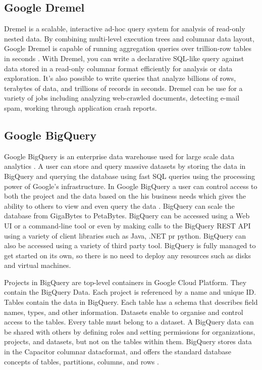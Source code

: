 \subsection{Google Dremel}
 
     Dremel is a scalable, interactive ad-hoc query system for
     analysis of read-only nested data. By combining multi-level
     execution trees and columnar data layout, Google Dremel is
     capable of running aggregation queries over trillion-row tables
     in seconds \cite{paper-dremel}. With Dremel, you can write a
     declarative SQL-like query against data stored in a read-only
     columnar format efficiently for analysis or data exploration.
     It's also possible to write queries that analyze billions of
     rows, terabytes of data, and trillions of records in
     seconds. Dremel can be use for a variety of jobs including
     analyzing web-crawled documents, detecting e-mail spam, working
     through application crash reports.

\subsection{Google BigQuery}


     Google BigQuery is an enterprise data
     warehouse used for large scale data
     analytics \cite{www-bigquery-documentation} \cite{www-bigquery}.
     A user can store
     and query massive datasets by storing the data in BigQuery and
     querying the database using fast SQL queries using the processing
     power of Google's infrastructure. In Google BigQuery a user can
     control access to both the project and the data based on the his
     business needs which gives the ability to others to view and even
     query the data \cite{www-bigquery}. BigQuery can scale the
     database from GigaBytes to PetaBytes. BigQuery can be accessed
     using a Web UI or a command-line tool or even by making calls to
     the BigQuery REST API using a variety of client libraries such as
     Java, .NET pr python. BigQuery can also be accessed using a
     variety of third party tool. BigQuery is fully managed to get
     started on its own, so there is no need to deploy any resources
     such as disks and virtual machines.

     Projects in BigQuery are top-level containers in Google
     Cloud Platform\cite{www-bigquery-documentation}. They contain the
     BigQuery Data. Each project is referenced by a name and
     unique ID. Tables contain the data in BigQuery. Each table has a
     schema that describes field names, types, and other
     information. Datasets enable to organise and control access to
     the tables. Every table must belong to a dataset. A BigQuery data
     can be shared with others by defining roles and setting
     permissions for organizations, projects, and datasets, but not on
     the tables within them. BigQuery stores data in the
     Capacitor columnar datacformat, and offers the standard database concepts of tables,
     partitions, columns, and rows \cite{www-bigquery-columnar-storage}.

